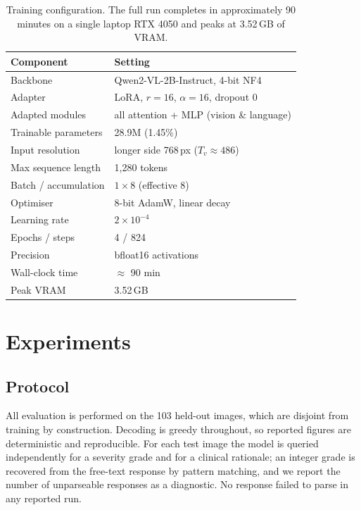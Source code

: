 \documentclass[conference]{IEEEtran}
\begin{document}
\begin{table}[t]
\caption{Training configuration. The full run completes in approximately 90
minutes on a single laptop RTX 4050 and peaks at 3.52\,GB of VRAM.}
\label{tab:config}
\centering
\small
\begin{tabular}{ll}
\toprule
\textbf{Component} & \textbf{Setting} \\
\midrule
Backbone & Qwen2-VL-2B-Instruct, 4-bit NF4 \\
Adapter & LoRA, $r=16$, $\alpha=16$, dropout $0$ \\
Adapted modules & all attention + MLP (vision \& language) \\
Trainable parameters & 28.9M (1.45\%) \\
Input resolution & longer side 768\,px ($T_v \approx 486$) \\
Max sequence length & 1{,}280 tokens \\
Batch / accumulation & $1 \times 8$ (effective 8) \\
Optimiser & 8-bit AdamW, linear decay \\
Learning rate & $2 \times 10^{-4}$ \\
Epochs / steps & 4 / 824 \\
Precision & bfloat16 activations \\
\midrule
Wall-clock time & $\approx$ 90 min \\
Peak VRAM & 3.52\,GB \\
\bottomrule
\end{tabular}
\end{table}

\section{Experiments}
\label{sec:experiments}

\subsection{Protocol}
All evaluation is performed on the 103 held-out images, which are disjoint from
training by construction. Decoding is greedy throughout, so reported figures are
deterministic and reproducible. For each test image the model is queried
independently for a severity grade and for a clinical rationale; an integer grade
is recovered from the free-text response by pattern matching, and we report the
number of unparseable responses as a diagnostic. No response failed to parse in
any reported run.
\end{document}
